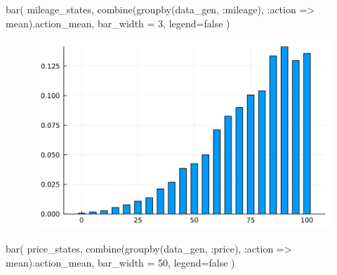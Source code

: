 \documentclass[
  letterpaper,
  DIV=11,
  numbers=noendperiod]{scrreprt}
\newenvironment{Shaded}{\begin{snugshade}}{\end{snugshade}}
\newcommand{\ConstantTok}[1]{\textcolor[rgb]{0.56,0.35,0.01}{#1}}
\newcommand{\FloatTok}[1]{\textcolor[rgb]{0.68,0.00,0.00}{#1}}
\newcommand{\FunctionTok}[1]{\textcolor[rgb]{0.28,0.35,0.67}{#1}}
\newcommand{\NormalTok}[1]{\textcolor[rgb]{0.00,0.23,0.31}{#1}}
\newcommand{\OperatorTok}[1]{\textcolor[rgb]{0.37,0.37,0.37}{#1}}
\begin{document}
\begin{Shaded}
\begin{Highlighting}[]
\FunctionTok{bar}\NormalTok{(}
\NormalTok{    mileage\_states,}
    \FunctionTok{combine}\NormalTok{(}\FunctionTok{groupby}\NormalTok{(data\_gen, }\OperatorTok{:}\NormalTok{mileage), }\OperatorTok{:}\NormalTok{action }\OperatorTok{=\textgreater{}}\NormalTok{ mean).action\_mean,}
\NormalTok{    bar\_width }\OperatorTok{=} \FloatTok{3}\NormalTok{, legend}\OperatorTok{=}\ConstantTok{false}
\NormalTok{)}
\end{Highlighting}
\end{Shaded}

\begin{figure}[H]

{\centering \includegraphics{./single_agent_dynamic_basic_files/figure-pdf/cell-22-output-1.svg}

}

\end{figure}

\begin{Shaded}
\begin{Highlighting}[]
\FunctionTok{bar}\NormalTok{(}
\NormalTok{    price\_states,}
    \FunctionTok{combine}\NormalTok{(}\FunctionTok{groupby}\NormalTok{(data\_gen, }\OperatorTok{:}\NormalTok{price), }\OperatorTok{:}\NormalTok{action }\OperatorTok{=\textgreater{}}\NormalTok{ mean).action\_mean,}
\NormalTok{    bar\_width }\OperatorTok{=} \FloatTok{50}\NormalTok{, legend}\OperatorTok{=}\ConstantTok{false}
\NormalTok{)}
\end{Highlighting}
\end{Shaded}
\end{document}
